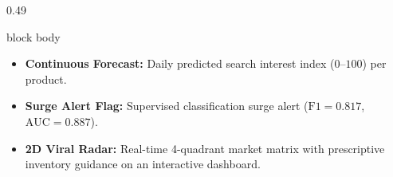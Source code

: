 \documentclass[aspectratio=169, 10pt]{beamer}
\newenvironment{card}[1][]{%
        \begin{beamercolorbox}[rounded=true,shadow=false,wd=\linewidth,sep=3.5pt,#1]{block body}%
        \fontsize{7.8pt}{9.8pt}\selectfont%
    }{%
        \end{beamercolorbox}%
    }
\begin{document}
\begin{frame}[t]
\begin{columns}[T]
\begin{column}{0.49\textwidth}
\begin{card}
                    \begin{itemize}\setlength{\itemsep}{1.2pt}                                                                                                                                         
                        \item \textbf{Continuous Forecast:} Daily predicted search interest index ($0$--$100$) per product.                                                                            
                        \item \textbf{Surge Alert Flag:} Supervised classification surge alert ($\text{F1} = 0.817$, $\text{AUC} = 0.887$).                                                            
                        \item \textbf{2D Viral Radar:} Real-time 4-quadrant market matrix with prescriptive inventory guidance on an interactive dashboard.                                            
                    \end{itemize}                                                                                                                                                                      
                \end{card}                                                                                                                                                                             
            \end{column}                                                                                                                                                                               
        \end{columns}                                                                                                                                                                                  
    \end{frame}                                                                                                                                                                                        
                                                                                                                                                                                                       
\end{document}
